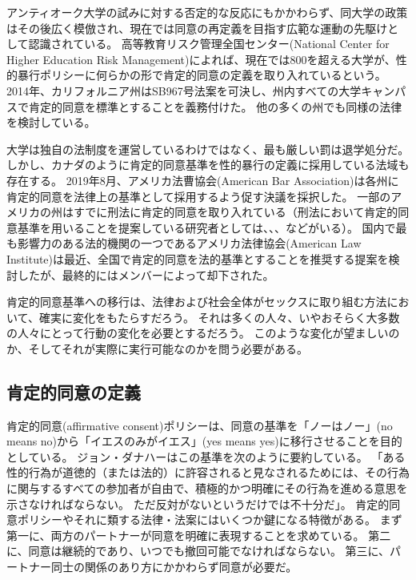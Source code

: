 \documentclass[paper=a4,book,openany]{jlreq}
\newcommand{\ig}[1]{}           %
\begin{document}
アンティオーク大学の試みに対する否定的な反応にもかかわらず、同大学の政策はその後広く模倣され、現在では同意の再定義を目指す広範な運動の先駆けとして認識されている。
高等教育リスク管理全国センター(National Center for Higher Education Risk Management)によれば、現在では800を超える大学が、性的暴行ポリシーに何らかの形で肯定的同意の定義を取り入れているという。
2014年、カリフォルニア州はSB967号法案を可決し、州内すべての大学キャンパスで肯定的同意を標準とすることを義務付けた。
他の多くの州でも同様の法律を検討している\citep{new14:_yes_means_yes_world}。

大学は独自の法制度を運営しているわけではなく、最も厳しい罰は退学処分だ。
しかし、カナダのように肯定的同意基準を性的暴行の定義に採用している法域も存在する。
2019年8月、アメリカ法曹協会(American Bar Association)は各州に肯定的同意を法律上の基準として採用するよう促す決議を採択した\citep[p.1]{domestic19:_repor_house_deleg}。
一部のアメリカの州はすでに刑法に肯定的同意を取り入れている（刑法において肯定的同意基準を用いることを提案している研究者としては、\citet{schulhofer98:_unwan_sex}、\citet{anderson05:_negot_sex}、\citet{decker11:_no_still_means_yes}などがいる）。
国内で最も影響力のある法的機関の一つであるアメリカ法律協会(American Law Institute)は最近、全国で肯定的同意を法的基準とすることを推奨する提案を検討したが、最終的にはメンバーによって却下された。

肯定的同意基準への移行は、法律および社会全体がセックスに取り組む方法において、確実に変化をもたらすだろう。
それは多くの人々、いやおそらく大多数の人々にとって行動の変化を必要とするだろう。
このような変化が望ましいのか、そしてそれが実際に実行可能なのかを問う必要がある。

\subsection{肯定的同意の定義}

肯定的同意(affirmative consent)ポリシーは、同意の基準を「ノーはノー」(no means no)から「イエスのみがイエス」(yes means yes)に移行させることを目的としている。
ジョン・ダナハー\ig{John Danaher}はこの基準を次のように要約している。
「ある性的行為が道徳的（または法的）に許容されると見なされるためには、その行為に関与するすべての参加者が自由で、積極的かつ明確にその行為を進める意思を示さなければならない。
ただ反対がないというだけでは不十分だ」\citep{danaher14:_yes_means_yes}。
肯定的同意ポリシーやそれに類する法律・法案にはいくつか鍵になる特徴がある。
まず第一に、両方のパートナーが同意を明確に表現することを求めている。
第二に、同意は継続的であり、いつでも撤回可能でなければならない。
第三に、パートナー同士の関係のあり方にかかわらず同意が必要だ。
\end{document}
